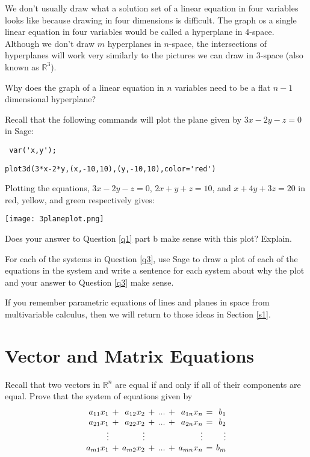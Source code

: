 We don't usually draw what a solution set of a linear equation in four variables looks like because drawing in four dimensions is difficult. The graph os a single linear equation in four variables would be called a hyperplane in $4$-space. Although we don't draw $m$ hyperplanes in $n$-space, the intersections of hyperplanes will work very similarly to the pictures we can draw in 3-space (also known as $\mathbb{R}^3$).

\bq Why does the graph of a linear equation in $n$ variables need to be a flat $n-1$ dimensional hyperplane?
\eq

Recall that the following commands will plot the plane given by $3x-2y-z=0$ in Sage:

\verb" var('x,y'); "

\verb"plot3d(3*x-2*y,(x,-10,10),(y,-10,10),color='red') "

Plotting the equations, $3x-2y-z=0$, $2x+y+z=10$, and $x+4y+3z=20$ in red, yellow, and green respectively gives:

\begin{center}\texttt{[image: 3planeplot.png]}\end{center}

\begin{question} Does your answer to Question \ref{q1} part b make sense with this plot? Explain.
\end{question}

\bq For each of the systems in Question \ref{q3}, use Sage to draw a plot of each of the equations in the system and write a sentence for each system about why the plot and your answer to Question \ref{q3} make sense.
\eq

If you remember parametric equations of lines and planes in space from multivariable calculus, then we will return to those ideas in Section \ref{s1}.

\section{Vector and Matrix Equations}
Recall that two vectors in $\mathbb{R}^n$ are equal if and only if all of their components are equal.
\bq\label{q41} Prove that the system of equations given by
\begin{equation*}
\setlength{\arraycolsep}{2pt}
\begin{array}{rcrcrcrcr}
  a_{11} x_1  &+& a_{12} x_2 &+& ... &+&  a_{1n}x_n &=& b_1 \\ %
  a_{21} x_1  &+& a_{22} x_2 &+& ... &+&  a_{2n}x_n &=& b_2 \\
  \vdots  & & \vdots & &  & &  \vdots && \vdots \\
  a_{m1} x_1  &+& a_{m2} x_2 &+& ... &+&  a_{mn}x_n &=& b_m
\end{array}
\end{equation*}


